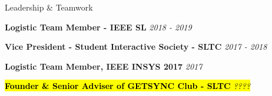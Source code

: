\documentclass[
	11pt, %
]{./assets/resume} %
\begin{document}

\begin{rSection}{Leadership \& Teamwork}

	\textbf{Logistic Team Member - IEEE SL} \hfill \textit{2018 - 2019}

	\textbf{Vice President - Student Interactive Society - SLTC} \hfill \textit{2017 - 2018}
	
	\textbf{Logistic Team Member, IEEE INSYS 2017} \hfill \textit{2017}

	\hl{\textbf{Founder \& Senior Adviser of GETSYNC Club - SLTC} \hfill \textit{????}}

\end{rSection}
















\end{document}
